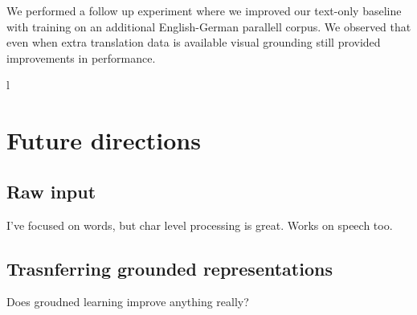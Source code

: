 We performed a follow up experiment where we improved our text-only baseline with 
training on an additional English-German parallell corpus. We observed that even when
extra translation data is available visual grounding still provided improvements in performance.





l%

\section{Future directions}


\subsection{Raw input}
I've focused on words, but char level processing is great. Works on speech too.

\subsection{Trasnferring grounded representations}
Does groudned learning improve anything really?



